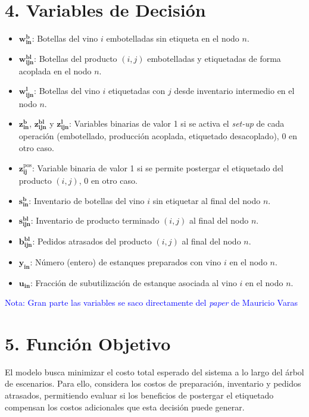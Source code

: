 \documentclass[11pt, letterpaper]{article}
\begin{document}
\section*{4. Variables de Decisión}
\begin{itemize}
    \item $\bm{w^b_{in}}$: Botellas del vino $i$ embotelladas sin etiqueta en el nodo $n$.
    
    \item $\bm{w^{bl}_{ijn}}$: Botellas del producto $(i,j)$ embotelladas y etiquetadas de forma acoplada en el nodo $n$.
    
    \item $\bm{w^l_{ijn}}$: Botellas del vino $i$ etiquetadas con $j$ desde inventario intermedio en el nodo $n$.

    \item $\bm{z^b_{in}}$, $\bm{z^{bl}_{ijn}}$ y
    $\bm{z^l_{ijn}}$: Variables binarias de valor 1 si se activa el \textit{set-up} de cada operación (embotellado, producción acoplada, etiquetado desacoplado), 0 en otro caso.
    
    \item $\bm{z^{\mathrm{pos}}_{ij}}$: Variable binaria de valor 1 si se permite postergar el etiquetado del producto $(i,j)$, 0 en otro caso.

    \item $\bm{s^b_{in}}$: Inventario de
    botellas del vino $i$ sin etiquetar al final del nodo $n$.
    
    \item $\bm{s^{bl}_{ijn}}$: Inventario
    de producto terminado $(i,j)$ al final del nodo $n$.
    
    \item $\bm{b^{bl}_{ijn}}$: Pedidos
    atrasados del producto $(i,j)$ al final del nodo $n$.

    \item $\bm{y_{in}}$: Número (entero) de estanques preparados con vino $i$ en el nodo $n$.
    
    \item $\bm{u_{in}}$: Fracción de subutilización de estanque asociada al vino $i$ en el nodo $n$.
\end{itemize}

\textcolor{blue}{Nota: Gran parte las variables se saco directamente del \textit{paper} de Mauricio Varas}


\section*{5. Función Objetivo}
El modelo busca minimizar el costo total esperado del sistema a lo largo del árbol de escenarios. Para ello, considera los costos de preparación, inventario y pedidos atrasados, permitiendo evaluar si los beneficios de postergar el etiquetado compensan los costos adicionales que esta decisión puede generar.
\end{document}

